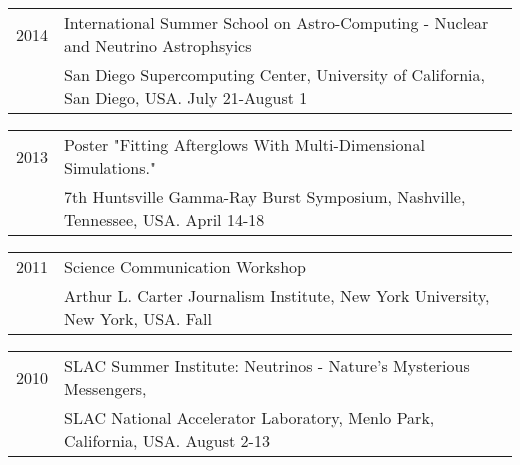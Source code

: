 \documentclass[letterpaper]{article}
\renewenvironment{itemize}{
  \begin{list}{}{
    \setlength{\leftmargin}{1.5em}
  }
}{
  \end{list}
}
\begin{document}
\begin{itemize}
\item \begin{tabular}{ll}
2014 & International Summer School on Astro-Computing - Nuclear and Neutrino Astrophsyics \\ 
	& San Diego Supercomputing Center, University of California, San Diego, USA. July 21-August 1
\end{tabular}

\item \begin{tabular}{ll}
2013 & Poster "Fitting Afterglows With Multi-Dimensional Simulations." \\ 
	&7th Huntsville Gamma-Ray Burst Symposium, Nashville, Tennessee, USA.  April 14-18 \\
\end{tabular}

\item \begin{tabular}{ll}
2011 & Science Communication Workshop\\
	& Arthur L. Carter Journalism Institute, New York University, New York, USA.  Fall \\
\end{tabular}

\item \begin{tabular}{ll}
2010 & SLAC Summer Institute: Neutrinos - Nature's Mysterious Messengers, \\ 
	 & SLAC National Accelerator Laboratory, Menlo Park, California, USA.  August 2-13\\
\end{tabular}
\end{itemize}




\end{document}

